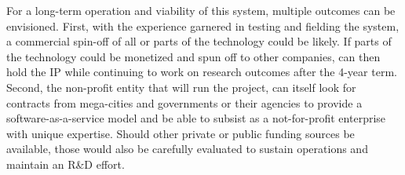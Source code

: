 

For a long-term operation and viability of this system, multiple
outcomes can be envisioned. First, with the experience garnered in
testing and fielding the system, a commercial spin-off of all or parts
of the technology could be likely. If parts of the technology could be
monetized and spun off to other companies, \pro can then hold the IP
while continuing to work on research outcomes after the 4-year
term. Second, the non-profit entity that will run the project, can
itself look for contracts from mega-cities and governments or their
agencies to provide a software-as-a-service model and be able to
subsist as a not-for-profit enterprise with unique expertise. Should
other private or public funding sources be available, those would also
be carefully evaluated to sustain operations and maintain an R\&D
effort.
